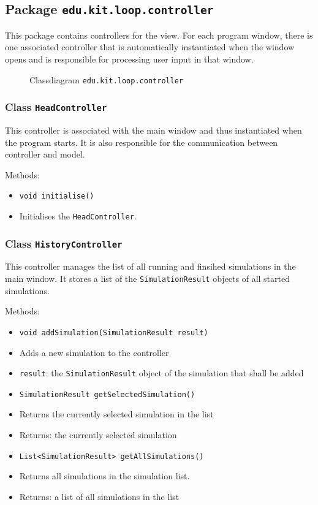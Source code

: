 \documentclass[parskip=full,11pt]{scrartcl}
\begin{document}
\subsection{Package \texttt{edu.kit.loop.controller}}
This package contains controllers for the view. For each program window, there is one associated controller that is automatically instantiated when the window opens and is responsible for processing user input in that window.

\iftrue
\begin{figure}[h]
	\centering
	\fontsize{4}{8}\selectfont
	
	
	\caption{Classdiagram \texttt{edu.kit.loop.controller}}
\end{figure}
\fi
\subsubsection{Class \texttt{HeadController}}
This controller is associated with the main window and thus instantiated when the program starts. It is also responsible for the communication between controller and model.

Methods:
\begin{itemize}\itemsep -10pt
	\item \texttt{void initialise()}
	\item[] Initialises the \texttt{HeadController}.
\end{itemize}

\subsubsection{Class \texttt{HistoryController}}
This controller manages the list of all running and finsihed simulations in the main window. It stores a list of the \texttt{SimulationResult} objects of all started simulations.

Methods:
\begin{itemize}\itemsep -10pt
	\item \texttt{void addSimulation(SimulationResult result)}
	\item[] Adds a new simulation to the controller
	\item[] \texttt{result}: the \texttt{SimulationResult} object of the simulation that shall be added
	
	\item \texttt{SimulationResult getSelectedSimulation()}
	\item[] Returns the currently selected simulation in the list
	\item[] Returns: the currently selected simulation
	
	\item \texttt{List<SimulationResult> getAllSimulations()}
	\item[] Returns all simulations in the simulation list.
	\item[] Returns: a list of all simulations in the list
\end{itemize}
\end{document}
